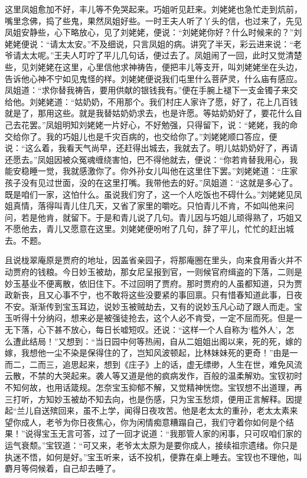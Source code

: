 \begin{parag}
    这里凤姐愈加不好，丰儿等不免哭起来。巧姐听见赶来。刘姥姥也急忙走到炕前，嘴里念佛，捣了些鬼，果然凤姐好些。一时王夫人听了丫头的信，也过来了，先见凤姐安静些，心下略放心，见了刘姥姥，便说：“刘姥姥你好？什么时候来的？”刘姥姥便说：“请太太安。”不及细说，只言凤姐的病。讲究了半天，彩云进来说：“老爷请太太呢。”王夫人叮咛了平儿几句话，便过去了。凤姐闹了一回，此时又觉清楚些，见刘姥姥在这里，心里信他求神祷告，便把丰儿等支开，叫刘姥姥坐在头边，告诉他心神不宁如见鬼怪的样。刘姥姥便说我们屯里什么菩萨灵，什么庙有感应。凤姐道：“求你替我祷告，要用供献的银钱我有。”便在手腕上褪下一支金镯子来交给他。刘姥姥道：“姑奶奶，不用那个。我们村庄人家许了愿，好了，花上几百钱就是了，那用这些。就是我替姑奶奶求去，也是许愿。等姑奶奶好了，要花什么自己去花罢。”凤姐明知刘姥姥一片好心，不好勉强，只得留下，说：“姥姥，我的命交给你了。我的巧姐儿也是千灾百病的，也交给你了。”刘姥姥顺口答应，便说：“这么着，我看天气尚早，还赶得出城去，我就去了。明儿姑奶奶好了，再请还愿去。”凤姐因被众冤魂缠绕害怕，巴不得他就去，便说：“你若肯替我用心，我能安稳睡一觉，我就感激你了。你外孙女儿叫他在这里住下罢。”刘姥姥道：“庄家孩子没有见过世面，没的在这里打嘴。我带他去的好。”凤姐道：“这就是多心了。既是咱们一家，这怕什么。虽说我们穷了，这一个人吃饭也不碍什么。”刘姥姥见凤姐真情，落得叫青儿住几天，又省了家里的嚼吃。只怕青儿不肯，不如叫他来问问，若是他肯，就留下。于是和青儿说了几句。青儿因与巧姐儿顽得熟了，巧姐又不愿他去，青儿又愿意在这里。刘姥姥便吩咐了几句，辞了平儿，忙忙的赶出城去。不题。
\end{parag}


\begin{parag}
    且说栊翠庵原是贾府的地址，因盖省亲园子，将那庵圈在里头，向来食用香火并不动贾府的钱粮。今日妙玉被劫，那女尼呈报到官，一则候官府缉盗的下落，二则是妙玉基业不便离散，依旧住下。不过回明了贾府。那时贾府的人虽都知道，只为贾政新丧，且又心事不宁，也不敢将这些没要紧的事回禀。只有惜春知道此事，日夜不安。渐渐传到宝玉耳边，说妙玉被贼劫去，又有的说妙玉凡心动了跟人而走。宝玉听得十分纳闷，想来必是被强徒抢去，这个人必不肯受，一定不屈而死。但是一无下落，心下甚不放心，每日长嘘短叹。还说：“这样一个人自称为‘槛外人’，怎么遭此结局！”又想到：“当日园中何等热闹，自从二姐姐出阁以来，死的死，嫁的嫁，我想他一尘不染是保得住的了，岂知风波顿起，比林妹妹死的更奇！”由是一而二，二而三，追思起来，想到《庄子》上的话，虚无缥缈，人生在世，难免风流云散，不禁的大哭起来。袭人等又道是他的疯病发作，百般的温柔解劝。宝钗初时不知何故，也用话箴规。怎奈宝玉抑郁不解，又觉精神恍惚。宝钗想不出道理，再三打听，方知妙玉被劫不知去向，也是伤感，只为宝玉愁烦，便用正言解释。因提起“兰儿自送殡回来，虽不上学，闻得日夜攻苦。他是老太太的重孙，老太太素来望你成人，老爷为你日夜焦心，你为闲情痴意糟蹋自己，我们守着你如何是个结果！”说得宝玉无言可答，过了一回才说道：“我那管人家的闲事，只可叹咱们家的运气衰颓。”宝钗道：“可又来，老爷太太原为是要你成人，接续祖宗遗绪。你只是执迷不悟，如何是好。”宝玉听来，话不投机，便靠在桌上睡去。宝钗也不理他，叫麝月等伺候着，自己却去睡了。
\end{parag}


